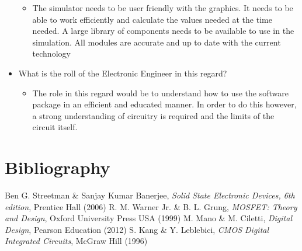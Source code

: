 \documentclass[12pt]{article}
\begin{document}
\begin{itemize}
\begin{itemize}
\item The simulator needs to be user friendly with the graphics. It needs to be able to work efficiently and calculate the values needed at the time needed. A large library of components needs to be available to use in the simulation. All modules are accurate and up to date with the current technology
\end{itemize}
\item What is the roll of the Electronic Engineer in this regard?\begin{itemize}
\item The role in this regard would be to understand how to use the software package in an efficient and educated manner. In order to do this however, a strong understanding of circuitry is required and the limits of the circuit itself.
\end{itemize}
\end {itemize}
\section{Bibliography}
\begin{thebibliography}{3}
  Ben G. Streetman \& Sanjay Kumar Banerjee,
  \emph{Solid State Electronic Devices, 6th edition},
  Prentice Hall (2006)
  R. M. Warner Jr. \& B. L. Grung,
  \emph{MOSFET: Theory and Design},
  Oxford University Press USA (1999)
  M. Mano \& M. Ciletti,
  \emph{Digital Design},
  Pearson Education (2012)
  S. Kang \& Y. Leblebici,
  \emph{CMOS Digital Integrated Circuits},
  McGraw Hill (1996)
\end{thebibliography}
\end{document}
